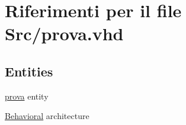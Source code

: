 \hypertarget{prova_8vhd}{\section{Riferimenti per il file Src/prova.vhd}
\label{prova_8vhd}
}
\subsection*{Entities}
\begin{DoxyCompactItemize}
\item 
\hyperlink{classprova}{prova} entity
\item 
\hyperlink{classprova_1_1_behavioral}{Behavioral} architecture
\end{DoxyCompactItemize}
